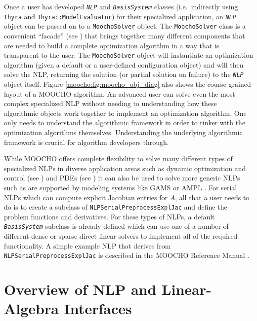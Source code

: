 \documentclass[pdf,12pt,report]{SANDreport}
\begin{document}
Once a user has developed {}\texttt{\textit{NLP}} and
{}\texttt{\textit{BasisSystem}} classes (i.e.\ indirectly using
{}\texttt{Thyra} and {}\texttt{Thyra::ModelEvaluator}) for their specialized
application, an {}\texttt{\textit{NLP}} object can be passed on to a
{}\texttt{Moocho\-Solver} object.  The {}\texttt{Moocho\-Solver} class is a
convenient ``facade'' (see {}\cite{ref:gama_et_al_1995}) that brings together
many different components that are needed to build a complete optimization
algorithm in a way that is transparent to the user.  The
{}\texttt{Moocho\-Solver} object will instantiate an optimization algorithm
(given a default or a user-defined configuration object) and will then solve
the NLP, returning the solution (or partial solution on failure) to the
{}\texttt{\textit{NLP}} object itself.  Figure
{}\ref{moocho:fig:moocho_obj_diag} also shows the course grained layout of a
MOOCHO algorithm.  An advanced user can solve even the most complex
specialized NLP without needing to understanding how these algorithmic objects
work together to implement an optimization algorithm.  One only needs to
understand the algorithmic framework in order to tinker with the optimization
algorithms themselves.  Understanding the underlying algorithmic framework is
crucial for algorithm developers through.

While MOOCHO offers complete flexibility to solve many different types of
specialized NLPs in diverse application areas such as dynamic optimization and
control (see {}\cite{ref:biegler_et_al_2001}) and PDEs (see
{}\cite{ref:biros_1999}) it can also be used to solve more generic NLPs such
as are supported by modeling systems like GAMS {}\cite{ref:brooke_gams_1997}
or AMPL {}\cite{ref:ampl_1993}.  For serial NLPs which can compute explicit
Jacobian entries for $A$, all that a user needs to do is to create a subclass
of {}\texttt{NLPSerialPreprocessExplJac} and define the problem functions and
derivatives.  For these types of NLPs, a default
{}\texttt{\textit{BasisSystem}} subclass is already defined which can use one
of a number of different dense or sparse direct linear solvers to implement
all of the required functionality.  A simple example NLP that derives from
{}\texttt{NLPSerialPreprocessExplJac} is described in the MOOCHO Reference
Manual {}\cite{ref:moochorefguide}.

%
\section{Overview of NLP and Linear-Algebra Interfaces}
\label{moocho:sec:nlp_and_lin_alg_itfc}
%
\end{document}
